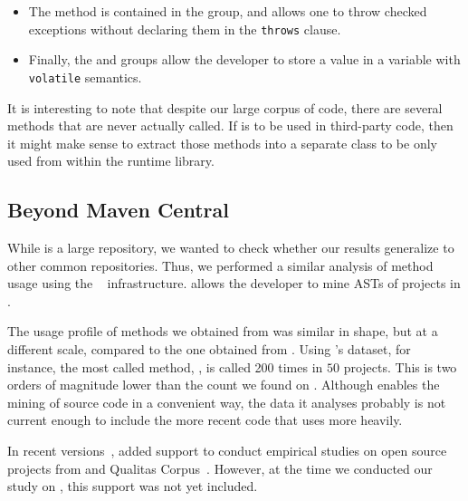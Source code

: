 \begin{itemize}
\item The  method is contained in the  group, and allows one to throw checked exceptions without declaring them in the \texttt{throws} clause.

\item Finally, the  and  groups allow the developer to store a value in a \java{} variable with \texttt{volatile} semantics.

\end{itemize}

It is interesting to note that despite our large corpus of code,
there are several \unsafe{} methods that are never actually called.
If \unsafe{} is to be used in third-party code,
then it might make sense to extract those methods into a separate class to be only used from within the runtime library.

\subsection*{Beyond Maven Central}

While \mavencentral{} is a large repository,
we wanted to check whether our results generalize to other common repositories.
Thus, we performed a similar analysis of method usage using the \boa{}~\citep{dyerBoaLanguageInfrastructure2013,dyerMiningSourceCode2013} infrastructure.
\boa{} allows the developer to mine ASTs of \java{} projects in \sourceforge{}.

The usage profile of \unsafe{} methods we obtained from \boa{} was similar in shape,
but at a different scale, compared to the one obtained from \mavencentral{}.
Using \boa{}'s \sourceforge{} dataset, for instance,
the most called method, , 
is called 200 times in $50$ projects.
This is two orders of magnitude lower than the count we found on \mavencentral{}.
Although \boa{} enables the mining of source code in a convenient way, 
the \code{} data it analyses probably is not current enough to include the more recent \java{} code that uses \smu{} more heavily.

In recent versions~\citep{boa-github},
\boa{} added support to conduct empirical studies on open source projects from \github{} and Qualitas Corpus~\citep{temperoQualitasCorpusCurated2010}.
However, at the time we conducted our study on \unsafe{},
this support was not yet included.
